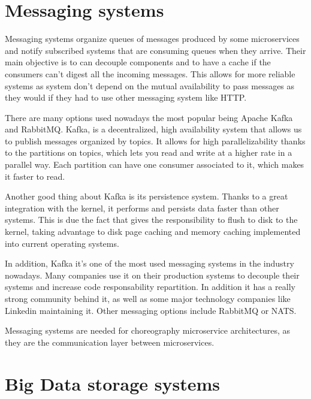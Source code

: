 
\section{Messaging systems}

Messaging systems organize queues of messages produced by some microservices and notify subscribed systems that are consuming queues when they arrive. Their main objective is to  can decouple components and to have a cache if the consumers can’t digest all the incoming messages. This allows for more reliable systems as system don’t depend on the mutual availability to pass messages as they would if they had to use other messaging system like HTTP.
 
There are many options used nowadays the most popular being Apache Kafka and RabbitMQ. Kafka, is a decentralized, high availability system that allows us to publish messages organized by topics. It allows for high parallelizability thanks to the partitions on topics, which lets you read and write at a higher rate in a parallel way.  Each partition can have one consumer associated to it, which makes it faster to read. 
 
Another good thing about Kafka is its persistence system. Thanks to a great integration with the kernel, it performs and persists data faster than other systems. This is due the fact that gives the responsibility to flush to disk to the kernel, taking advantage to disk page caching and memory caching implemented into current operating systems.
 
In addition, Kafka it’s one of the most used messaging systems in the industry nowadays. Many companies use it on their production systems to decouple their systems and increase code responsability repartition. In addition it has a really strong community behind it, as well as some major technology companies like Linkedin maintaining it. Other messaging options include RabbitMQ or NATS.
 
Messaging systems are needed for choreography microservice architectures, as they are the communication layer between microservices. 


\section{Big Data storage systems}

